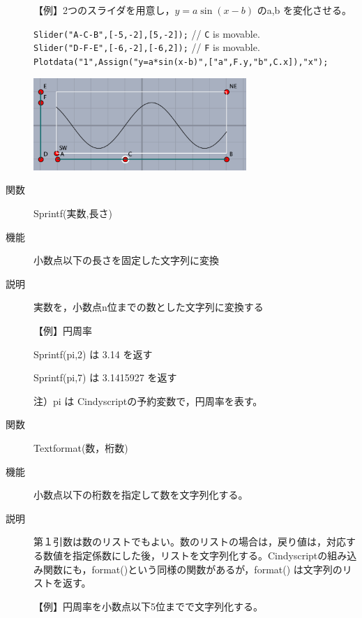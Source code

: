 \documentclass[papersize,a4paper,12pt,uplatex]{jsarticle}
\begin{document}
\begin{description}
\vspace{\baselineskip}
【例】2つのスライダを用意し，$y=a\sin(x-b)$ のa,b を変化させる。

\verb|Slider("A-C-B",[-5,-2],[5,-2]);| // \verb|C| is movable.\\
\verb|Slider("D-F-E",[-6,-2],[-6,2]);| // \verb|F| is movable.\\
\verb|Plotdata("1",Assign("y=a*sin(x-b)",["a",F.y,"b",C.x]),"x"); |

\vspace{2mm}
\hspace{15mm}
\includegraphics[bb=0.00 0.00 445.02 193.01,height=35mm]{Fig/slider.pdf} 

\vspace{\baselineskip}
\hypertarget{sprintf}{}
\item[関数]Sprintf(実数,長さ)
\item[機能]小数点以下の長さを固定した文字列に変換
\item[説明]実数を，小数点n位までの数とした文字列に変換する

\vspace{\baselineskip}
【例】円周率

 Sprintf(pi,2) は 3.14 を返す

 Sprintf(pi,7) は 3.1415927 を返す

注）pi は Cindyscriptの予約変数で，円周率を表す。%

\vspace{\baselineskip}
\hypertarget{textformat}{}
\item[関数]Textformat(数，桁数)
\item[機能]小数点以下の桁数を指定して数を文字列化する。
\item[説明]第１引数は数のリストでもよい。数のリストの場合は，戻り値は，対応する数値を指定係数にした後，リストを文字列化する。Cindyscriptの組み込み関数にも，format()という同様の関数があるが，format() は文字列のリストを返す。

\vspace{\baselineskip}
【例】円周率を小数点以下5位までで文字列化する。


\end{description}
\end{document}
